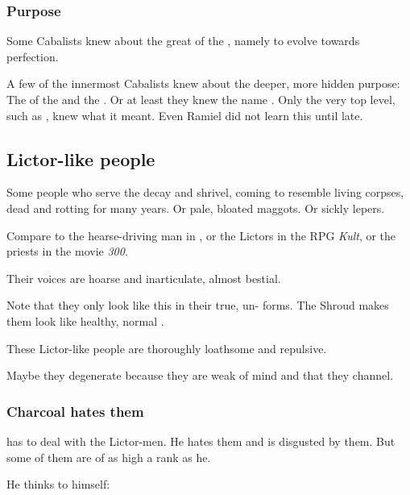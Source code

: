 \subsubsection{Purpose}
Some Cabalists knew about the great  of the \resphain, namely to evolve towards perfection. 

A few of the innermost Cabalists knew about the deeper, more hidden purpose: 
The  of the \baneking \Voidbringer and the \noggyal {}.
Or at least they knew the name . 
Only the very top level, such as \Azraid, knew what it meant.
Even Ramiel did not learn this until late. 









\subsection{Lictor-like people}
Some people who serve the \banes{} decay and shrivel, coming to resemble living corpses, dead and rotting for many years. Or pale, bloated maggots. Or sickly lepers. 

Compare to the hearse-driving man in , or the Lictors in the RPG \emph{Kult}, or the priests in the movie \emph{300}.

Their voices are hoarse and inarticulate, almost bestial.

Note that they only look like this in their true, un- forms. The Shroud makes them look like healthy, normal \humans.

These Lictor-like people are thoroughly loathsome and repulsive. 

Maybe they degenerate because they are weak of mind and  that they channel.





\subsubsection{Charcoal hates them}
 has to deal with the Lictor-men. He hates them and is disgusted by them. But some of them are of as high a rank as he. 

He thinks to himself: 















